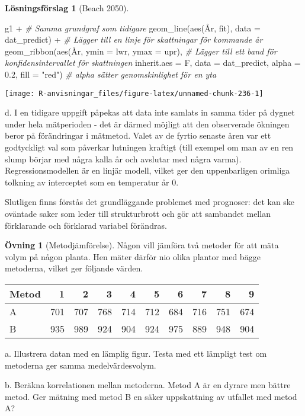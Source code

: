 \documentclass[
]{book}
\newenvironment{Shaded}{\begin{snugshade}}{\end{snugshade}}
\newcommand{\AttributeTok}[1]{\textcolor[rgb]{0.77,0.63,0.00}{#1}}
\newcommand{\CommentTok}[1]{\textcolor[rgb]{0.56,0.35,0.01}{\textit{#1}}}
\newcommand{\FloatTok}[1]{\textcolor[rgb]{0.00,0.00,0.81}{#1}}
\newcommand{\FunctionTok}[1]{\textcolor[rgb]{0.00,0.00,0.00}{#1}}
\newcommand{\NormalTok}[1]{#1}
\newcommand{\SpecialCharTok}[1]{\textcolor[rgb]{0.00,0.00,0.00}{#1}}
\newcommand{\StringTok}[1]{\textcolor[rgb]{0.31,0.60,0.02}{#1}}
\theoremstyle{definition}
\theoremstyle{definition}
\theoremstyle{definition}
\newtheorem{exercise}{Övning}[chapter]
\theoremstyle{definition}
\newtheorem{hypothesis}{Lösningsförslag}[chapter]
\theoremstyle{remark}
\begin{document}
\begin{hypothesis}[Beach 2050]
\begin{Shaded}
\begin{Highlighting}[]
\NormalTok{g1 }\SpecialCharTok{+} \CommentTok{\# Samma grundgraf som tidigare}
  \FunctionTok{geom\_line}\NormalTok{(}\FunctionTok{aes}\NormalTok{(År, fit), }\AttributeTok{data =}\NormalTok{ dat\_predict) }\SpecialCharTok{+} \CommentTok{\# Lägger till en linje för skattningar för kommande år}
  \FunctionTok{geom\_ribbon}\NormalTok{(}\FunctionTok{aes}\NormalTok{(År, }\AttributeTok{ymin =}\NormalTok{ lwr, }\AttributeTok{ymax =}\NormalTok{ upr),  }\CommentTok{\# Lägger till ett band för konfidensintervallet för skattningen}
              \AttributeTok{inherit.aes =}\NormalTok{ F, }\AttributeTok{data =}\NormalTok{ dat\_predict,}
              \AttributeTok{alpha =} \FloatTok{0.2}\NormalTok{, }\AttributeTok{fill =} \StringTok{"red"}\NormalTok{) }\CommentTok{\# alpha sätter genomskinlighet för en yta}
\end{Highlighting}
\end{Shaded}

\begin{center}\texttt{[image: R-anvisningar\_files/figure-latex/unnamed-chunk-236-1]} \end{center}

d. I en tidigare uppgift påpekas att data inte samlats in samma tider på dygnet under hela mätperioden - det är därmed möjligt att den observerade ökningen beror på förändringar i mätmetod. Valet av de fyrtio senaste åren var ett godtyckligt val som påverkar lutningen kraftigt (till exempel om man av en ren slump börjar med några kalla år och avslutar med några varma). Regressionsmodellen är en linjär modell, vilket ger den uppenbarligen orimliga tolkning av interceptet som en temperatur år 0.

Slutligen finns förstås det grundläggande problemet med prognoser: det kan ske oväntade saker som leder till strukturbrott och gör att sambandet mellan förklarande och förklarad variabel förändras.
\end{hypothesis}

\begin{exercise}[Metodjämförelse]
Någon vill jämföra två metoder för att mäta volym på någon planta. Hen mäter därför nio olika plantor med bägge metoderna, vilket ger följande värden.

\begin{table}
\centering
\begin{tabular}[t]{lrrrrrrrrr}
\toprule
Metod & 1 & 2 & 3 & 4 & 5 & 6 & 7 & 8 & 9\\
\midrule
A & 701 & 707 & 768 & 714 & 712 & 684 & 716 & 751 & 674\\
B & 935 & 989 & 924 & 904 & 924 & 975 & 889 & 948 & 904\\
\bottomrule
\end{tabular}
\end{table}

a. Illustrera datan med en lämplig figur. Testa med ett lämpligt test om metoderna ger samma medelvärdesvolym.

b. Beräkna korrelationen mellan metoderna. Metod A är en dyrare men bättre metod. Ger mätning med metod B en säker uppskattning av utfallet med metod A?
\end{exercise}
\end{document}
